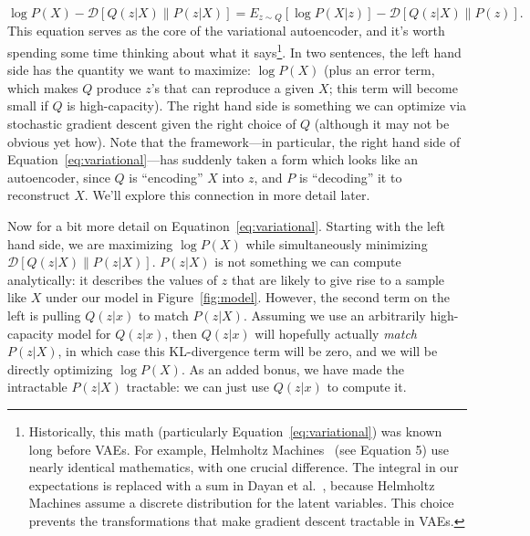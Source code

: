 \documentclass[a4paper, 11pt]{article} %
\begin{document}
\begin{equation}
    \log P(X) - \mathcal{D}\left[Q(z|X)\|P(z|X)\right]=E_{z\sim Q}\left[\log P(X|z)  \right] - \mathcal{D}\left[Q(z|X)\|P(z)\right].
    \label{eq:variational}
\end{equation}
\noindent This equation serves as the core of the variational autoencoder, and it's worth spending some time thinking about what it says\footnote{
Historically, this math (particularly Equation~\ref{eq:variational}) was known long before VAEs.
For example, Helmholtz Machines~\cite{dayan1995helmholtz} (see Equation 5) use nearly identical mathematics, with one crucial difference.
The integral in our expectations is replaced with a sum in Dayan et al.~\cite{dayan1995helmholtz}, because Helmholtz Machines assume a discrete distribution for the latent variables.  
This choice prevents the transformations that make gradient descent tractable in VAEs.
}.  
In two sentences, the left hand side has the quantity we want to maximize: $\log P(X)$ (plus an error term, which makes $Q$ produce $z$'s that can reproduce a given $X$; this term will become small if $Q$ is high-capacity).
The right hand side is something we can optimize via stochastic gradient descent given the right choice of $Q$ (although it may not be obvious yet how).
Note that the framework---in particular, the right hand side of Equation~\ref{eq:variational}---has suddenly taken a form which looks like an autoencoder, since $Q$ is ``encoding'' $X$ into $z$, and $P$ is ``decoding'' it to reconstruct $X$.
We'll explore this connection in more detail later.

Now for a bit more detail on Equatinon~\ref{eq:variational}.
Starting with the left hand side, we are maximizing $\log P(X)$ while simultaneously minimizing $\mathcal{D}\left[Q(z|X)\|P(z|X)\right]$.  
$P(z|X)$ is not something we can compute analytically: it describes the values of $z$ that are likely to give rise to a sample like $X$ under our model in Figure~\ref{fig:model}.  
However, the second term on the left is pulling $Q(z|x)$ to match $P(z|X)$.
Assuming we use an arbitrarily high-capacity model for $Q(z|x)$, then $Q(z|x)$ will hopefully actually \textit{match} $P(z|X)$, in which case this KL-divergence term will be zero, and we will be directly optimizing $\log P(X)$.  
As an added bonus, we have made the intractable $P(z|X)$ tractable: we can just use $Q(z|x)$ to compute it.
\end{document}
